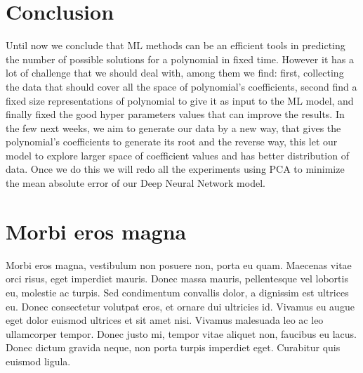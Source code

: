 \documentclass[a4paper,UKenglish]{lipics-v2016}
\begin{document}
 \section{Conclusion}\label{section5}
 Until now we conclude that ML methods can be an efficient tools in predicting the number of possible solutions for a polynomial in fixed time. However it has a lot of challenge that we should deal with, among them we find: first, collecting the data that should cover all the space of polynomial’s coefficients, second find a fixed size representations of polynomial to give it as input to the ML model, and finally fixed the good hyper parameters values that can improve the results.
 In the few next weeks, we aim to generate our data by a new way, that gives the polynomial’s  coefficients to generate its  root and the reverse way, this let our model to explore larger space of coefficient values and has better distribution of data. Once we do this we will redo all the experiments  using PCA to minimize the mean absolute error of our Deep Neural Network model.


\appendix
\section{Morbi eros magna}

Morbi eros magna, vestibulum non posuere non, porta eu quam. Maecenas vitae orci risus, eget imperdiet mauris. Donec massa mauris, pellentesque vel lobortis eu, molestie ac turpis. Sed condimentum convallis dolor, a dignissim est ultrices eu. Donec consectetur volutpat eros, et ornare dui ultricies id. Vivamus eu augue eget dolor euismod ultrices et sit amet nisi. Vivamus malesuada leo ac leo ullamcorper tempor. Donec justo mi, tempor vitae aliquet non, faucibus eu lacus. Donec dictum gravida neque, non porta turpis imperdiet eget. Curabitur quis euismod ligula.





\end{document}
